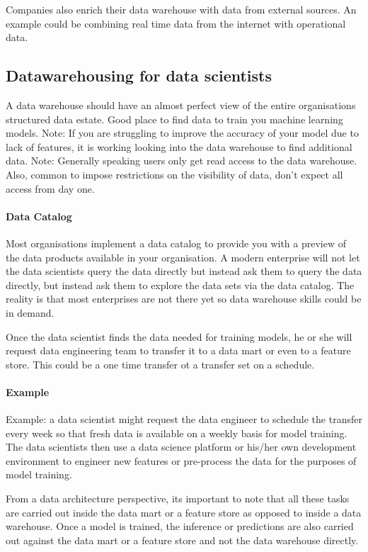 \documentclass[a4paper, 11pt]{article}
\begin{document}
    Companies also enrich their data warehouse with data from external sources.
    An example could be combining real time data from the internet with operational data.

    \subsection{Datawarehousing for data scientists}

    A data warehouse should have an almost perfect view of the entire organisations structured data estate.
    Good place to find data to train you machine learning models.
    Note: If you are struggling to improve the accuracy of your model due to lack of features, it is working looking into the data warehouse to find additional data.
    Note: Generally speaking users only get read access to the data warehouse.
    Also, common to impose restrictions on the visibility of data, don't expect all access from day one.

    \paragraph{Data Catalog}
    Most organisations implement a data catalog to provide you with a preview of the data products available in your organisation.
    A modern enterprise will not let the data scientists query the data directly but instead ask them to query the data directly, but instead ask them to explore the data sets via the data catalog.
    The reality is that most enterprises are not there yet so data warehouse skills could be in demand.

    Once the data scientist finds the data needed for training models, he or she will request data engineering team to transfer it to a data mart or even to a feature store.
    This could be a one time transfer ot a transfer set on a schedule.

    \paragraph{Example}
    Example: a data scientist might request the data engineer to schedule the transfer every week so that fresh data is available on a weekly basis for model training.
    The data scientists then use a data science platform or his/her own development environment to engineer new features or pre-process the data for the purposes of model training.

    From a data architecture perspective, its important to note that all these tasks are carried out inside the data mart or a feature store as opposed to inside a data warehouse.
    Once a model is trained, the inference or predictions are also carried out against the data mart or a feature store and not the data warehouse directly.
\end{document}
